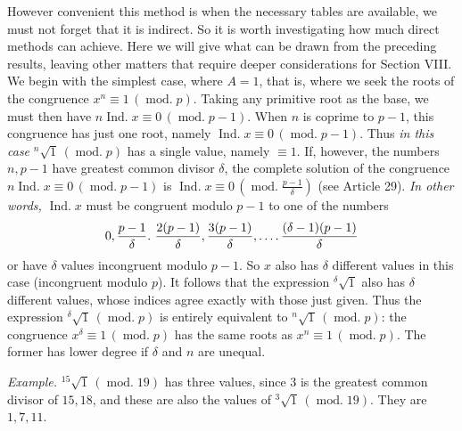 However convenient this method is when the necessary tables are available, we must not forget that it is indirect. So it is worth investigating how much direct methods can achieve. Here we will give what can be drawn from the preceding results, leaving other matters that require deeper considerations for Section VIII. We begin with the simplest case, where $A=1$, that is, where we seek the roots of the congruence $x^n\equiv1\,(\operatorname{mod.}p)$. Taking any primitive root as the base, we must then have $n\operatorname{Ind.}x\equiv0\,(\operatorname{mod.}p-1)$. When $n$ is coprime to $p-1$, this congruence has just one root, namely $\operatorname{Ind.}x\equiv0\,(\operatorname{mod.}p-1)$. Thus \emph{in this case} ${}^{n}\!\surd1\,(\operatorname{mod.}p)$ has a single value, namely $\equiv1$. If, however, the numbers $n,p-1$ have greatest common divisor $\delta$, the complete solution of the congruence $n\operatorname{Ind.}x\equiv0\,(\operatorname{mod.}p-1)$ is $\operatorname{Ind.}x\equiv0\,(\operatorname{mod.}\frac{p-1}{\delta})$ (see Article 29). \emph{In other words,} $\operatorname{Ind.}x$ must be congruent modulo $p-1$ to one of the numbers
\[0,\frac{p-1}{\delta}.\ \frac{2(p-1)}{\delta},\frac{3(p-1)}{\delta},\GaussFourDots\frac{(\delta-1)(p-1)}{\delta}\]
or have $\delta$ values incongruent modulo $p-1$. So $x$ also has $\delta$ different values in this case (incongruent modulo
$p$). It follows that the expression ${}^{\delta}\!\surd {1}$ also has $\delta$ different values, whose indices agree exactly with those just given. Thus the expression ${}^{\delta}\!\surd {1}\,(\operatorname{mod.}p)$ is entirely equivalent to ${}^{n}\!\surd {1}\,(\operatorname{mod.}p)$: the congruence $x^\delta\equiv1\,(\operatorname{mod.}p)$ has the same roots as $x^n\equiv1\,(\operatorname{mod.}p)$. The former has lower degree if $\delta$ and $n$ are unequal.

\emph{Example.} ${}^{15}\!\surd {1}\,(\operatorname{mod.}19)$ has three values, since $3$ is the greatest common divisor of $15,18$, and these are also the values of ${}^{3}\!\surd {1}\,(\operatorname{mod.}19)$. They are $1,7,11$.

